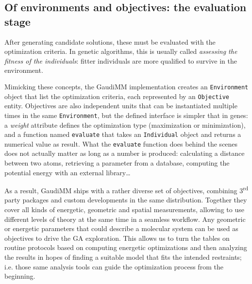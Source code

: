 


\subsection{Of environments and objectives: the evaluation stage}
After generating candidate solutions, these must be evaluated with the optimization criteria. In genetic algorithms, this is usually called \textit{assessing the fitness of the individuals}: fitter individuals are more qualified to survive in the environment.

Mimicking these concepts, the GaudiMM implementation creates an \texttt{Environment} object that list the optimization criteria, each represented by an \texttt{Objective} entity. Objectives are also independent units that can be instantiated multiple times in the same \texttt{Environment}, but the defined interface is simpler that in genes: a \textit{weight} attribute defines the optimization type (maximization or minimization), and a function named \texttt{evaluate} that takes an \texttt{Individual} object and returns a numerical value as result. What the \texttt{evaluate} function does behind the scenes does not actually matter as long as a number is produced: calculating a distance between two atoms, retrieving a parameter from a database, computing the potential energy with an external library\ldots

As a result, GaudiMM ships with a rather diverse set of objectives, combining 3\textsuperscript{rd} party packages and custom developments in the same distribution. Together they cover all kinds of energetic, geometric and spatial measurements, allowing to use different levels of theory at the same time in a seamless workflow. Any geometric or energetic parameters that could describe a molecular system can be used as objectives to drive the GA exploration. This allows us to turn the tables on routine protocols based on computing energetic optimizations and then analyzing the results in hopes of finding a suitable model that fits the intended restraints; i.e. those same analysis tools can guide the optimization process from the beginning.

